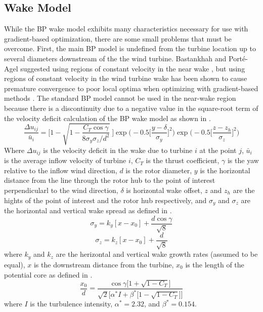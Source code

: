 \documentclass[conf]{new-aiaa}
\begin{document}
\subsection{Wake Model}
While the BP wake model exhibits many characteristics necessary for use with gradient-based optimization, there are some small problems that must be overcome. First, the main BP model is undefined from the turbine location up to several diameters downstream of the the wind turbine. Bastankhah and Port\'{e}-Agel suggested using regions of constant velocity in the near wake \cite{bastankhah2016}, but using regions of constant velocity in the wind turbine wake has been shown to cause premature convergence to poor local optima when optimizing with gradient-based methods \cite{thomas2017}. The standard BP model cannot be used in the near-wake region because there is a discontinuity due to a negative value in the square-root term of the velocity deficit calculation of the BP wake model as shown in . 
\begin{equation}\label{eq:bp-vel}
	\frac{\Delta u_{ij}}{\bar{u}_{i}} = \Bigg[1-\sqrt{1-\frac{C_{T} \cos{\gamma}}{8 \sigma_y \sigma_z/d^2}}~\Bigg] \exp{\bigg(-0.5\bigg[\frac{y-\delta}{\sigma_y}\bigg]^2\bigg)}\exp{\bigg(-0.5\bigg[\frac{z-z_h}{\sigma_z}\bigg]^2\bigg)}
\end{equation}
%
Where $\Delta u_{ij}$ is the velocity deficit in the wake due to turbine $i$ at the point $j$, $\bar{u}_{i}$ is the average inflow velocity of turbine $i$, $C_T$ is the thrust coefficient, $\gamma$ is the yaw relative to the inflow wind direction, $d$ is the rotor diameter, $y$ is the horizontal distance from the line through the rotor hub to the point of interest perpendicularl to the wind direction, $\delta$ is horizontal wake offset, $z$ and $z_h$ are the hights of the point of interest and the rotor hub respectively, and $\sigma_y$ and $\sigma_z$ are the horizontal and vertical wake spread as defined in .
%
\begin{equation}\label{eq:sigmay}
	\sigma_y = k_y [x - x_0] + \frac{d \cos{\gamma}}{\sqrt{8}}
\end{equation}
%
%
\begin{equation}\label{eq:sigmaz}
	\sigma_z = k_z [x - x_0] + \frac{d}{\sqrt{8}}
\end{equation}
%
where $k_y$ and $k_z$ are the herizontal and vertical wake growth rates (assumed to be equal), $x$  is the downstream distance from the turbine, $x_0$ is the length of the potential core as defined in .
%
\begin{equation}\label{eq:potentialcore}
	\frac{x_0}{d} = \frac{\cos{\gamma }\Big[1+\sqrt{1-C_T}\Big]}{\sqrt{2} \Big[\alpha ^* I + \beta ^* \Big[1- \sqrt{1-C_T}\Big]\Big]}
\end{equation}
where $I$ is the turbulence intensity, $\alpha^*=2.32$, and $\beta^*=0.154$. 
\end{document}
